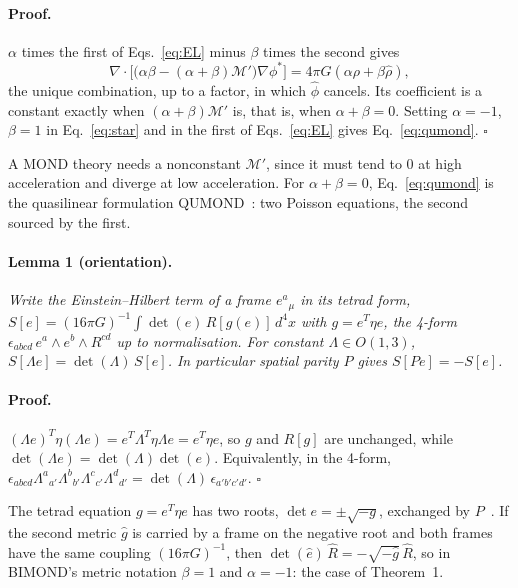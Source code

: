 \documentclass[twocolumn]{iopjournal}
\begin{document}
\paragraph{Proof.} $\alpha$ times the first of Eqs.~\eqref{eq:EL}
minus $\beta$ times the second gives
\begin{equation}
  \nabla\cdot\Big[\big(\alpha\beta - (\alpha+\beta)\mathcal{M}'\big)
  \nabla\phi^*\Big] = 4\pi G(\alpha\rho + \beta\hat\rho),
  \label{eq:star}
\end{equation}
the unique combination, up to a factor, in which $\hat\phi$ cancels. Its
coefficient is a constant exactly when $(\alpha+\beta)\mathcal{M}'$
is, that is, when $\alpha + \beta = 0$. Setting $\alpha = -1$,
$\beta = 1$ in Eq.~\eqref{eq:star} and in the first of
Eqs.~\eqref{eq:EL} gives Eq.~\eqref{eq:qumond}. \hfill $\square$

\medskip
\noindent
A MOND theory needs a nonconstant $\mathcal{M}'$, since it must tend
to $0$ at high acceleration and diverge at low acceleration. For
$\alpha + \beta = 0$, Eq.~\eqref{eq:qumond} is the quasilinear
formulation QUMOND~\cite{Milgrom2010qumond}: two Poisson equations,
the second sourced by the first.

\paragraph{Lemma 1 (orientation).} \textit{Write the Einstein--Hilbert
term of a frame $e^a{}_\mu$ in its tetrad form,
$S[e] = (16\pi G)^{-1}\!\int \det(e)\,R[g(e)]\,d^4x$ with
$g = e^T\eta e$, the 4-form
$\epsilon_{abcd}\,e^a\wedge e^b\wedge R^{cd}$ up to normalisation.
For constant $\Lambda \in O(1,3)$, $S[\Lambda e] = \det(\Lambda)\,S[e]$.
In particular spatial parity $P$ gives $S[Pe] = -S[e]$.}

\paragraph{Proof.} $(\Lambda e)^T\eta(\Lambda e) = e^T\Lambda^T\eta
\Lambda e = e^T\eta e$, so $g$ and $R[g]$ are unchanged, while
$\det(\Lambda e) = \det(\Lambda)\det(e)$. Equivalently, in the
4-form, $\epsilon_{abcd}\Lambda^a{}_{a'}\Lambda^b{}_{b'}
\Lambda^c{}_{c'}\Lambda^d{}_{d'} = \det(\Lambda)\,\epsilon_{a'b'c'd'}$.
\hfill $\square$

\medskip
\noindent
The tetrad equation $g = e^T\eta e$ has two roots,
$\det e = \pm\sqrt{-g}$, exchanged by $P$~\cite{TwoRegions}. If the
second metric $\hat g$ is carried by a frame on the negative root
and both frames have the same coupling $(16\pi G)^{-1}$, then
$\det(\hat e)\,\hat R = -\sqrt{-\hat g}\,\hat R$, so in BIMOND's
metric notation $\beta = 1$ and $\alpha = -1$: the case of
Theorem~1.
\end{document}
